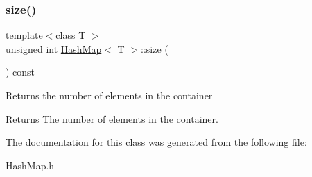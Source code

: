 \subsubsection{\texorpdfstring{size()}{size()}}
{\footnotesize\ttfamily template$<$class T $>$ \\
unsigned int \hyperlink{class_hash_map}{Hash\+Map}$<$ T $>$\+::size (\begin{DoxyParamCaption}{ }\end{DoxyParamCaption}) const}

Returns the number of elements in the container \begin{DoxyReturn}{Returns}
The number of elements in the container. 
\end{DoxyReturn}


The documentation for this class was generated from the following file\+:\begin{DoxyCompactItemize}
\item 
Hash\+Map.\+h\end{DoxyCompactItemize}
